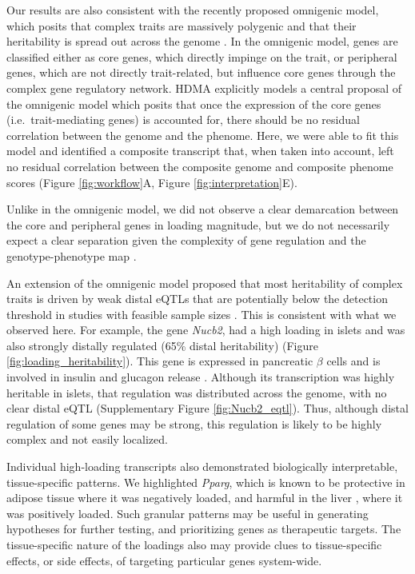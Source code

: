 \documentclass[
]{article}
\begin{document}
Our results are also consistent with the recently proposed omnigenic
model, which posits that complex traits are massively polygenic and that
their heritability is spread out across the genome \cite{pmid28622505}.
In the omnigenic model, genes are classified either as core genes, which
directly impinge on the trait, or peripheral genes, which are not
directly trait-related, but influence core genes through the complex
gene regulatory network. HDMA explicitly models a central proposal of
the omnigenic model which posits that once the expression of the core
genes (i.e.~trait-mediating genes) is accounted for, there should be no
residual correlation between the genome and the phenome. Here, we were
able to fit this model and identified a composite transcript that, when
taken into account, left no residual correlation between the composite
genome and composite phenome scores (Figure \ref{fig:workflow}A, Figure
\ref{fig:interpretation}E).

Unlike in the omnigenic model, we did not observe a clear demarcation
between the core and peripheral genes in loading magnitude, but we do
not necessarily expect a clear separation given the complexity of gene
regulation and the genotype-phenotype map \cite{pmid29906445}.

An extension of the omnigenic model proposed that most heritability of
complex traits is driven by weak distal eQTLs that are potentially below
the detection threshold in studies with feasible sample sizes
\cite{pmid31051098}. This is consistent with what we observed here. For
example, the gene \textit{Nucb2}, had a high loading in islets and was
also strongly distally regulated (65\% distal heritability) (Figure
\ref{fig:loading_heritability}). This gene is expressed in pancreatic
\(\beta\) cells and is involved in insulin and glucagon release
\cite{pmid24993278, pmid23537085, pmid22108805}. Although its
transcription was highly heritable in islets, that regulation was
distributed across the genome, with no clear distal eQTL (Supplementary
Figure \ref{fig:Nucb2_eqtl}). Thus, although distal regulation of some
genes may be strong, this regulation is likely to be highly complex and
not easily localized.

Individual high-loading transcripts also demonstrated biologically
interpretable, tissue-specific patterns. We highlighted \textit{Pparg},
which is known to be protective in adipose tissue \cite{pmid17389767}
where it was negatively loaded, and harmful in the liver
\cite{pmid12805374, pmid12618528, 
pmid16357043, pmid15644454, pmid16403437}, where it was positively
loaded. Such granular patterns may be useful in generating hypotheses
for further testing, and prioritizing genes as therapeutic targets. The
tissue-specific nature of the loadings also may provide clues to
tissue-specific effects, or side effects, of targeting particular genes
system-wide.
\end{document}
